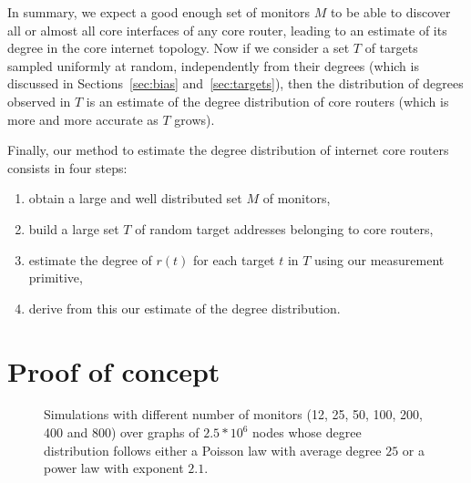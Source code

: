 \documentclass[conference]{IEEEtran}
\begin{document}
In summary, we expect a good enough set of monitors $M$ to be able to discover all or almost all core interfaces of any core router, leading to an estimate of its degree in the core internet topology. Now if we consider a set $T$ of targets sampled uniformly at random, independently from their degrees (which is discussed in Sections~\ref{sec:bias} and~\ref{sec:targets}), then the distribution of degrees observed in $T$ is an estimate of the degree distribution of core routers (which is more and more accurate as $T$ grows).

Finally, our method to estimate the degree distribution of internet core routers consists in four steps:
\begin{enumerate}
\item obtain a large and well distributed set $M$ of monitors,
\item build a large set $T$ of random target addresses belonging to core routers,
\item estimate the degree of $r(t)$ for each target $t$ in $T$ using our measurement primitive,
\item derive from this our estimate of the degree distribution.
\end{enumerate}


\section{Proof of concept} \label{sec:concept}

\begin{figure}[!t]\centering
\hfill
{}
\hfill
{}
\hfill
\caption{Simulations with different number of monitors (12, 25, 50, 100, 200, 400 and 800) over graphs of $2.5*10^6$ nodes whose degree distribution follows either a Poisson law with average degree $25$ or a power law with exponent $2.1$.}
\label{fig:simul}
\end{figure}
\end{document}
